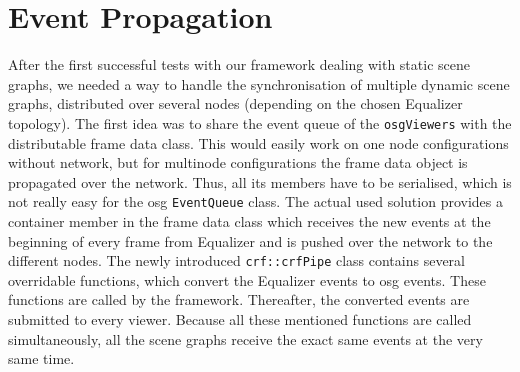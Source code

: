 \section{Event Propagation}
After the first successful tests with our framework dealing with static scene graphs, we needed a way to handle the synchronisation of multiple dynamic scene graphs, distributed over several nodes (depending on the chosen Equalizer topology). The first idea was to  share the event queue of the \texttt{osgViewers} with the distributable frame data class. This would easily work on one node configurations without network, but for multinode configurations the frame data object is propagated over the network. Thus, all its members have to be serialised, which is not really easy for the \gls{osg} \texttt{EventQueue} class. The actual used solution provides a container member in the frame data class which receives the new events at the beginning of every frame from Equalizer and is pushed over the network to the different nodes. The newly introduced \texttt{crf::crfPipe} class contains several overridable functions, which convert the Equalizer events to \gls{osg} events. These functions are called by the framework. Thereafter, the converted events are submitted to every viewer. Because all these mentioned functions are called simultaneously, all the scene graphs receive the exact same events at the very same time.

